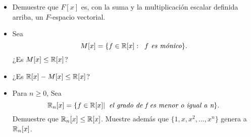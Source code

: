 \begin{ej}
\begin{itemize}
	\item Demuestre que $F[x]$ es, con la suma y la multiplicación
	escalar definida arriba, un $F$-espacio vectorial.
	\item Sea
	\[
	M[x] = \{ f \in \mathbb{R}[x] : \hspace{0.2cm} f \textit{ es mónico} \}.
	\]
	¿Es $M[x] \leq \mathbb{R}[x]$?
	\item ¿Es $\mathbb{R}[x] - M[x] \leq \mathbb{R}[x]$?
	\item Para $n \geq 0$, Sea
	\[
	\mathbb{R}_{n}[x] = \{ f \in \mathbb{R}[x]  | \hspace{0.2cm} \textit{el grado de f es 
	menor o igual a n}  \}.
	\]
	Demuestre que $\mathbb{R}_{n}[x] \leq \mathbb{R}[x]$. Muestre además que
	$\{ 1, x, x^{2}, \ldots , x^{n} \}$ genera a $\mathbb{R}_{n}[x]$.
\end{itemize}
\end{ej}

